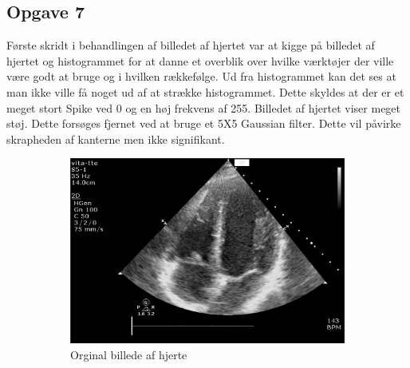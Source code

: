 \documentclass{article}
\begin{document}
\subsection{Opgave 7}
Første skridt i behandlingen af billedet af hjertet var at kigge på billedet af hjertet og histogrammet for at danne et overblik over hvilke værktøjer der ville være godt at bruge og i hvilken rækkefølge.\newline 
Ud fra histogrammet kan det ses at man ikke ville få noget ud af at strække histogrammet. Dette skyldes at der er et meget stort Spike ved 0 og en høj frekvens af 255.\newline 
Billedet af hjertet viser meget støj. Dette forsøges fjernet ved at bruge et 5X5 Gaussian filter. Dette vil påvirke skrapheden af kanterne men ikke signifikant. 
\begin{figure}[H]
    \begin{subfigure}[b]{0.49\textwidth}
        \includegraphics[width=\textwidth]{Image/heart.png}
        \caption{Orginal billede af hjerte}
        \label{fig:f7}
    \end{subfigure}
    \hfill
    \begin{subfigure}[b]{0.49\textwidth}

\end{subfigure}
\end{figure}
\end{document}
